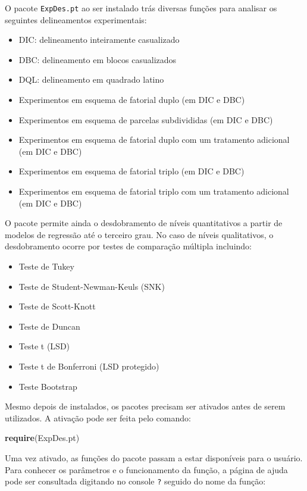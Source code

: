 \documentclass[
]{article}
\newenvironment{Shaded}{\begin{snugshade}}{\end{snugshade}}
\newcommand{\KeywordTok}[1]{\textcolor[rgb]{0.13,0.29,0.53}{\textbf{#1}}}
\newcommand{\NormalTok}[1]{#1}
\providecommand{\tightlist}{%
  \setlength{\itemsep}{0pt}\setlength{\parskip}{0pt}}
\begin{document}
O pacote \texttt{ExpDes.pt} ao ser instalado trás diversas funções para analisar os seguintes delineamentos experimentais:

\begin{itemize}
\tightlist
\item
  DIC: delineamento inteiramente casualizado
\item
  DBC: delineamento em blocos casualizados
\item
  DQL: delineamento em quadrado latino
\item
  Experimentos em esquema de fatorial duplo (em DIC e DBC)
\item
  Experimentos em esquema de parcelas subdivididas (em DIC e DBC)
\item
  Experimentos em esquema de fatorial duplo com um tratamento adicional (em DIC e DBC)
\item
  Experimentos em esquema de fatorial triplo (em DIC e DBC)
\item
  Experimentos em esquema de fatorial triplo com um tratamento adicional (em DIC e DBC)
\end{itemize}

O pacote permite ainda o desdobramento de níveis quantitativos a partir de modelos de regressão até o terceiro grau. No caso de níveis qualitativos, o desdobramento ocorre por testes de comparação múltipla incluindo:

\begin{itemize}
\tightlist
\item
  Teste de Tukey
\item
  Teste de Student-Newman-Keuls (SNK)
\item
  Teste de Scott-Knott
\item
  Teste de Duncan
\item
  Teste t (LSD)
\item
  Teste t de Bonferroni (LSD protegido)
\item
  Teste Bootstrap
\end{itemize}

Mesmo depois de instalados, os pacotes precisam ser ativados antes de serem utilizados. A ativação pode ser feita pelo comando:

\begin{Shaded}
\begin{Highlighting}[]
\KeywordTok{require}\NormalTok{(ExpDes.pt)}
\end{Highlighting}
\end{Shaded}

Uma vez ativado, as funções do pacote passam a estar disponíveis para o usuário. Para conhecer os parâmetros e o funcionamento da função, a página de ajuda pode ser consultada digitando no console \texttt{?} seguido do nome da função:
\end{document}
